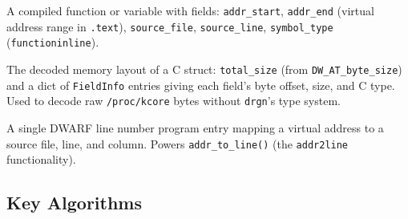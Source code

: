 \documentclass[11pt,a4paper]{article}
\newcommand{\coderef}[1]{\texttt{\small\color{layer2}#1}}
\begin{document}
\begin{description}[leftmargin=1.5em, itemsep=3pt]
  \item[\coderef{BinarySymbol}] A compiled function or variable with fields:
        \texttt{addr\_start}, \texttt{addr\_end} (virtual address range in
        \texttt{.text}), \texttt{source\_file}, \texttt{source\_line},
        \texttt{symbol\_type} (\texttt{function\textbar{}inline}).

  \item[\coderef{StructLayout}] The decoded memory layout of a C struct:
        \texttt{total\_size} (from \texttt{DW\_AT\_byte\_size}) and a dict of
        \coderef{FieldInfo} entries giving each field's byte offset, size, and
        C type. Used to decode raw \texttt{/proc/kcore} bytes without
        \texttt{drgn}'s type system.

  \item[\coderef{LineEntry}] A single DWARF line number program entry mapping
        a virtual address to a source file, line, and column. Powers
        \texttt{addr\_to\_line()} (the \texttt{addr2line} functionality).
\end{description}

\subsection{Key Algorithms}
\end{document}
